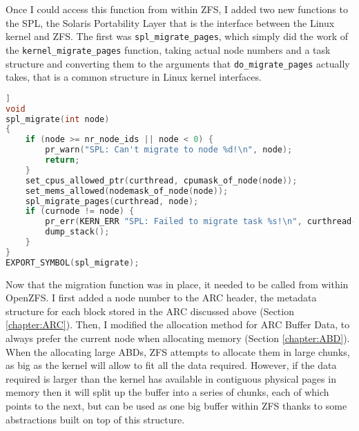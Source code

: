 \singlespacing

\doublespacing

Once I could access this function from within ZFS, I added two new functions to the SPL, the Solaris Portability Layer
that is the interface between the Linux kernel and ZFS.
The first was \texttt{spl\_migrate\_pages}, which simply did the work of the \texttt{kernel\_migrate\_pages} function,
taking actual node numbers and a task structure and converting them to the arguments that \texttt{do\_migrate\_pages} actually
takes, that is a common structure in Linux kernel interfaces.

\singlespacing
\begin{lstlisting}[caption={The \texttt{spl\_migrate} function, used to move the current process
to another NUMA node},label={lst:splmigratefunction},language=C]]
void
spl_migrate(int node)
{
	if (node >= nr_node_ids || node < 0) {
		pr_warn("SPL: Can't migrate to node %d!\n", node);
		return;
	}
	set_cpus_allowed_ptr(curthread, cpumask_of_node(node));
	set_mems_allowed(nodemask_of_node(node));
	spl_migrate_pages(curthread, node);
	if (curnode != node) {
		pr_err(KERN_ERR "SPL: Failed to migrate task %s!\n", curthread->comm);
		dump_stack();
	}
}
EXPORT_SYMBOL(spl_migrate);
\end{lstlisting}
\doublespacing

Now that the migration function was in place, it needed to be called from within OpenZFS.
I first added a node number to the ARC header, the metadata structure for each block stored in the ARC discussed above
(Section \ref{chapter:ARC}).
Then, I modified the allocation method for ARC Buffer Data, to always prefer the current node when allocating memory (Section \ref{chapter:ABD}).
When the allocating large ABDs, ZFS attempts to allocate them in large chunks, as big as the
kernel will allow to fit all the data required. 
However, if the data required is larger than the kernel has available in contiguous physical pages in memory
then it will split up the buffer into a series of chunks, each of which points to the next,
but can be used as one big buffer within ZFS thanks to some abstractions built on top of this structure.

